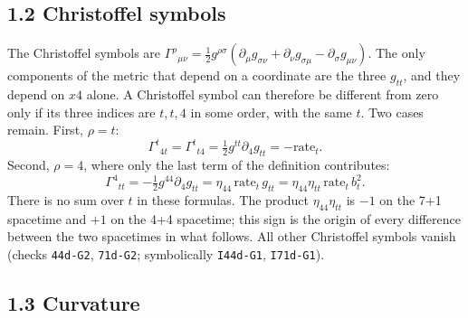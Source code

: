 \documentclass[
  10pt,
]{article}
\begin{document}
\hypertarget{christoffel-symbols}{%
\subsection{1.2 Christoffel symbols}\label{christoffel-symbols}}

The Christoffel symbols are
\(\Gamma^\rho{}_{\mu\nu}=\tfrac12g^{\rho\sigma}(\partial_\mu g_{\sigma\nu}+\partial_\nu g_{\sigma\mu}-\partial_\sigma g_{\mu\nu})\).
The only components of the metric that depend on a coordinate are the
three \(g_{tt}\), and they depend on \(x4\) alone. A Christoffel symbol
can therefore be different from zero only if its three indices are
\(t,t,4\) in some order, with the same \(t\). Two cases remain. First,
\(\rho=t\):
\[\Gamma^t{}_{4t}=\Gamma^t{}_{t4}=\tfrac12g^{tt}\partial_4g_{tt}=-\mathrm{rate}_t .\tag{1.5}\]
Second, \(\rho=4\), where only the last term of the definition
contributes:
\[\Gamma^4{}_{tt}=-\tfrac12g^{44}\partial_4g_{tt}=\eta_{44}\,\mathrm{rate}_t\,g_{tt}
=\eta_{44}\eta_{tt}\,\mathrm{rate}_t\,b_t^2 .\tag{1.6}\] There is no sum
over \(t\) in these formulas. The product \(\eta_{44}\eta_{tt}\) is
\(-1\) on the 7+1 spacetime and \(+1\) on the 4+4 spacetime; this sign
is the origin of every difference between the two spacetimes in what
follows. All other Christoffel symbols vanish (checks \texttt{44d-G2},
\texttt{71d-G2}; symbolically \texttt{I44d-G1}, \texttt{I71d-G1}).

\hypertarget{curvature}{%
\subsection{1.3 Curvature}\label{curvature}}
\end{document}
